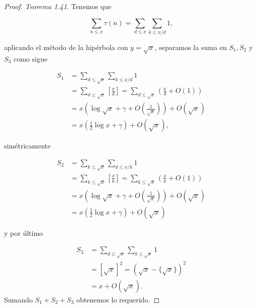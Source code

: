 \begin{proof} \textit{Teorema 1.41}. Tenemos que 

$$\sum_{n \leqslant x} \tau(n)=\sum_{d \leqslant x} \sum_{k \leqslant x / d} 1,$$

aplicando el método de la hipérbola con $y=\sqrt{x}$, separamos la suma en $S_1, S_2$ y $S_3$ como sigue 

$$\begin{aligned}
S_1 & =\sum_{d \leqslant \sqrt{x}} \sum_{k \leqslant x / d} 1 \\
& =\sum_{d \leqslant \sqrt{x}}\left[\frac{x}{d}\right]=\sum_{d \leqslant \sqrt{x}}\left(\frac{x}{d}+O(1)\right) \\
& =x\left(\log \sqrt{x}+\gamma+O\left(\frac{1}{\sqrt{x}}\right)\right)+O(\sqrt{x}) \\
& =x\left(\frac{1}{2} \log x+\gamma\right)+O(\sqrt{x}),
\end{aligned}$$

simétricamente 

$$\begin{aligned}
S_2 & =\sum_{k \leqslant \sqrt{x}} \sum_{d \leqslant x / k} 1 \\
& =\sum_{k \leqslant \sqrt{x}}\left[\frac{x}{k}\right]=\sum_{k \leqslant \sqrt{x}}\left(\frac{x}{k}+O(1)\right) \\
& =x\left(\log \sqrt{x}+\gamma+O\left(\frac{1}{\sqrt{x}}\right)\right)+O(\sqrt{x}) \\
& =x\left(\frac{1}{2} \log x+\gamma\right)+O(\sqrt{x})
\end{aligned}$$

y por último

$$\begin{aligned}
S_3 & =\sum_{d \leqslant \sqrt{x}} \sum_{k \leqslant \sqrt{x}} 1 \\
& =[\sqrt{x}]^2=(\sqrt{x}-\{\sqrt{x}\})^2 \\
& =x+O(\sqrt{x}).
\end{aligned}$$
Sumando $S_1+S_2+S_3$ obtenemos lo requerido.


\end{proof}
